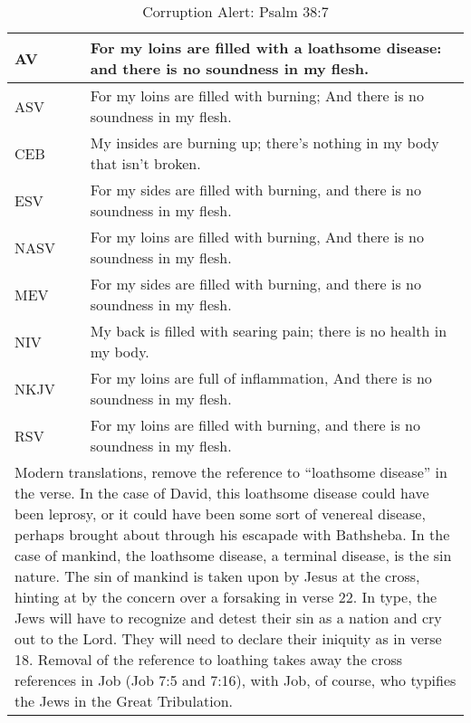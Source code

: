 
\begin{center}

\begin{table}[ht]
\centering
\begin{tabular}{|p{.5in}|p{3.5in}|}
\hline

\textcolor[rgb]{0.00,0.00,1.00}{AV} & \textcolor[rgb]{0.00,0.00,1.00}{For my loins are filled with a \textcolor[cmyk]{0.00,0.84, 0.8, 0.19}{loathsome disease}: and there is no soundness in my flesh.} \\ \hline
\vspace{0.08in}

ASV &  For my loins are filled with burning; And there is no soundness in my flesh. \\ \hline
%
CEB &  My insides are burning up;     there’s nothing in my body that isn’t broken.\\ \hline
%
ESV & For my sides are filled with burning,     and there is no soundness in my flesh.\\ \hline
%
NASV &  For my loins are filled with burning, And there is no soundness in my flesh.\\ \hline
%
MEV & For my sides are filled with burning,  and there is no soundness in my flesh. \\ \hline
%
NIV &  My back is filled with searing pain;  there is no health in my body. \\ \hline
%
NKJV &  For my loins are full of inflammation, And there is no soundness in my flesh.\\ \hline
%
RSV &  For my loins are filled with burning,   and there is no soundness in my flesh. \\ \hline \hline


\multicolumn{2}{|p{4.2in}|}{{\textcolor{jungle}{Modern translations, remove the reference to ``loathsome disease'' in the verse. In the case of David, this loathsome disease could have been leprosy, or it could have been some sort of venereal disease, perhaps brought about through his escapade with Bathsheba. In the case of mankind, the loathsome disease, a terminal disease, is the sin nature.  The sin of mankind is taken upon by Jesus at the cross, hinting at by the concern over a forsaking in verse 22. In type, the Jews will have to recognize and detest their sin as a nation and cry out to the Lord. They will need to declare their iniquity as in verse 18.  Removal of the reference to loathing takes away the cross references in Job (Job 7:5 and 7:16), with Job, of course, who typifies the Jews in the Great Tribulation.}}} \\ \hline

\end{tabular}
\caption[Corruption Alert: Psalm 38:7]{Corruption Alert: Psalm 38:7} \label{table:CorruptionPsalm-38-7}
\end{table}

\end{center}

